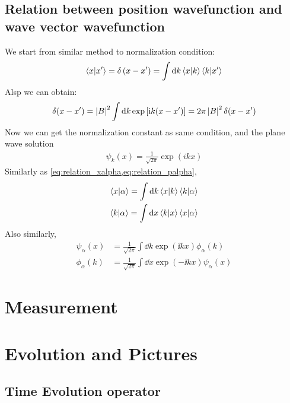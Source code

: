 \subsection{Relation between position wavefunction and wave vector wavefunction}
We start from similar method to normalization condition: 
\begin{eqnarray}
    \braket{x|x'} = \delta\left(x-x'\right) = \int \mathrm{d} k \braket{x|k} \braket{k|x'} 
\end{eqnarray}
Alsp we can obtain: 
\begin{eqnarray}
    \delta(x-x') = \left| B \right|^2 \int \mathrm{d} k \exp\left[\mathrm{i} k (x-x')\right] = 2 \pi \left| B \right|^2 \delta(x-x')
\end{eqnarray}
Now we can get the normalization constant as same condition, and the plane wave solution
\begin{align}
    \psi_k(x) = \frac{1}{\sqrt{2\pi}} \exp(ikx) \label{eq:wavefunction_xk} 
\end{align}
Similarly as \cref{eq:relation_xalpha,eq:relation_palpha}, 
\begin{align}
    \braket{x|\alpha} = \int \mathrm{d} k \braket{x|k} \braket{k|\alpha} \\ 
    \braket{k|\alpha} = \int \mathrm{d} x \braket{k|x} \braket{x|\alpha}
\end{align}
Also similarly,
\begin{align}
    \psi_ \alpha (x) &= \frac{1}{\sqrt{2 \pi}} \int \dd k \exp \left(\ii k x\right) \phi_\alpha(k) \label{eq:wavefunction_relation_ktox} \\ 
    \phi_ \alpha (k) &= \frac{1}{\sqrt{2 \pi}} \int \dd x \exp \left(- \ii k x\right) \psi_ \alpha(x) \label{eq:wavefunction_relation_xtok}
\end{align}

\section{Measurement}

\newpage

\section{Evolution and Pictures}

\subsection{Time Evolution operator} \label{sec:time_evolution_operator}

